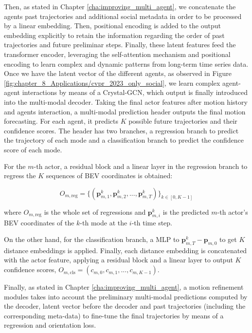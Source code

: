 Then, as stated in Chapter \ref{cha:improving_multi_agent}, we concatenate the agents past trajectories and additional social metadata in order to be processed by a linear embedding. Then, positional encoding is added to the output embedding explicitly to retain the information regarding the order of past trajectories and future preliminar steps. Finally, these latent features feed the transformer encoder, leveraging the self-attention mechanism and positional encoding to learn complex and dynamic patterns from long-term time series data. Once we have the latent vector of the different agents, as observed in Figure \ref{fig:chapter_8_Applications/cvpr_2023_only_social}, we learn complex agent-agent interactions by means of a Crystal-\ac{GCN}, which output is finally introduced into the multi-modal decoder. Taking the final actor features after motion history and agents interaction, a multi-modal prediction header outputs the final motion forecasting. For each agent, it predicts $K$ possible future trajectories and their confidence scores. The header has two branches, a regression branch to predict the trajectory of each mode and a classification branch to predict the confidence score of each mode.

For the $m$-th actor, a residual block and a linear layer in the regression branch to regress the $K$ sequences of BEV coordinates is obtained:

\begin{equation}
	O_{m, \text{reg}} = \{ (\mathbf{p}_{m,1}^k, \mathbf{p}_{m,2}^k, ..., \mathbf{p}_{m,T}^k) \}_{k \in [0, K-1]}
\end{equation}

where $O_{m, \text{reg}}$ is the whole set of regressions and $\mathbf{p}_{m,i}^k$ is the predicted $m$-th actor's BEV coordinates of the $k$-th mode at the $i$-th time step.

On the other hand, for the classification branch, a MLP to $\mathbf{p}_{m,T}^k - \mathbf{p}_{m,0}$ to get $K$ distance embeddings is applied. Finally, each distance embedding is concatenated with the actor feature, applying a residual block and a linear layer to output $K$ confidence scores, $O_{m, \text{cls}} = (c_{m,0}, c_{m,1}, ..., c_{m,K-1})$.

Finally, as stated in Chapter \ref{cha:improving_multi_agent}, a motion refinement modules takes into account the preliminary multi-modal predictions computed by the decoder, latent vector before the decoder and past trajectories (including the corresponding meta-data) to fine-tune the final trajectories by means of a regression and orientation loss.

